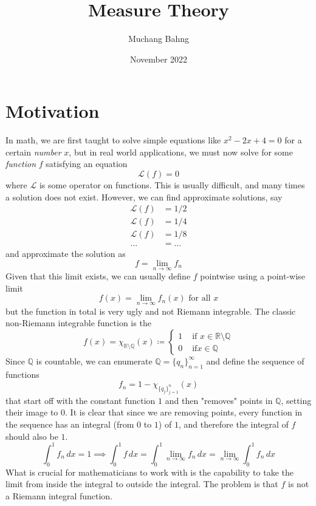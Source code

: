 \documentclass{article}
\theoremstyle{remark}
\theoremstyle{definition}
\begin{document}
\pagestyle{fancy}

\cfoot{\thepage / \pageref{LastPage}}

\title{Measure Theory}
\author{Muchang Bahng}
\date{November 2022}

\maketitle 

\section{Motivation}

In math, we are first taught to solve simple equations like $x^2 - 2x + 4 = 0$ for a certain \textit{number} $x$, but in real world applications, we must now solve for some \textit{function} $f$ satisfying an equation 
\[\mathcal{L}(f) = 0\]
where $\mathcal{L}$ is some operator on functions. This is usually difficult, and many times a solution does not exist. However, we can find approximate solutions, say 
\begin{align*}
    \mathcal{L}(f) & = 1/2 \\
    \mathcal{L}(f) & = 1/4 \\ 
    \mathcal{L}(f) & = 1/8 \\
    \ldots & = \ldots 
\end{align*}
and approximate the solution as 
\[f = \lim_{n \rightarrow \infty} f_n \]
Given that this limit exists, we can usually define $f$ pointwise using a point-wise limit 
\[f(x) = \lim_{n \rightarrow \infty} f_n (x) \text{ for all } x\]
but the function in total is very ugly and not Riemann integrable. The classic non-Riemann integrable function is the 
\[f(x) = \chi_{\mathbb{R} \setminus \mathbb{Q}} (x) \coloneqq \begin{cases} 
1 & \text{ if } x \in \mathbb{R} \setminus \mathbb{Q} \\
0 & \text{ if} x \in \mathbb{Q} 
\end{cases}\]
Since $\mathbb{Q}$ is countable, we can enumerate $\mathbb{Q} = \{q_n\}_{n=1}^\infty$ and define the sequence of functions 
\[f_n = 1 - \chi_{\{q_j\}_{j=1}^n}(x)\]
that start off with the constant function $1$ and then "removes" points in $\mathbb{Q}$, setting their image to $0$. It is clear that since we are removing points, every function in the sequence has an integral (from $0$ to $1$) of $1$, and therefore the integral of $f$ should also be $1$. 
\[\int_0^1 f_n \, dx = 1 \implies \int_0^1 f \,dx = \int_0^1 \lim_{n \rightarrow \infty} f_n \,dx = \lim_{n \rightarrow \infty} \int_0^1 f_n \,dx\]
What is crucial for mathematicians to work with is the capability to take the limit from inside the integral to outside the integral. The problem is that $f$ is not a Riemann integral function. 
\end{document}
